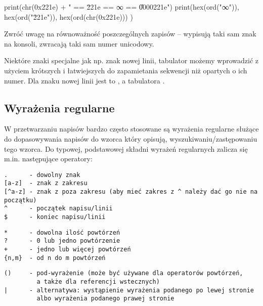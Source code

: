 \begin{CodeFrame*}[python]{}
print(chr(0x221e) + " == \u221e == ∞ == \U0000221e")
print(hex(ord("∞")), hex(ord("\u221e")), hex(ord(chr(0x221e))) )
\end{CodeFrame*}

Zwróć uwagę na równoważność poszczególnych zapisów – wypisują taki sam znak na konsoli, zwracają taki sam numer unicodowy.

Niektóre znaki specjalne jak np. znak nowej linii, tabulator możemy wprowadzić z użyciem krótszych i łatwiejszych do zapamietania sekwencji niż opartych o ich numer. Dla znaku nowej linii jest to \python{\n}, a tabulatora \python{\t}.

\subsection{Wyrażenia regularne }

W przetwarzaniu napisów bardzo często stosowane są wyrażenia regularne służące do dopasowywania napisów do wzorca który opisują, wyszukiwaniu/zastępowaniu tego wzorca. Do typowej, podstawowej składni wyrażeń regularnych zalicza się m.in. następujące operatory:

\vspace{-6pt}\begin{Verbatim}
.      - dowolny znak
[a-z]  - znak z zakresu
[^a-z] - znak z poza zakresu (aby mieć zakres z ^ należy dać go nie na początku)
^      - początek napisu/linii
$      - koniec napisu/linii
\end{Verbatim}
\vspace{-8pt}\begin{Verbatim}
*      - dowolna ilość powtórzeń
?      - 0 lub jedno powtórzenie
+      - jedno lub więcej powtórzeń
{n,m}  - od n do m powtórzeń
\end{Verbatim}
\vspace{-8pt}\begin{Verbatim}
()     - pod-wyrażenie (może być używane dla operatorów powtórzeń,
         a także dla referencji wstecznych)
|      - alternatywa: wystąpienie wyrażenia podanego po lewej stronie
         albo wyrażenia podanego prawej stronie
\end{Verbatim}

